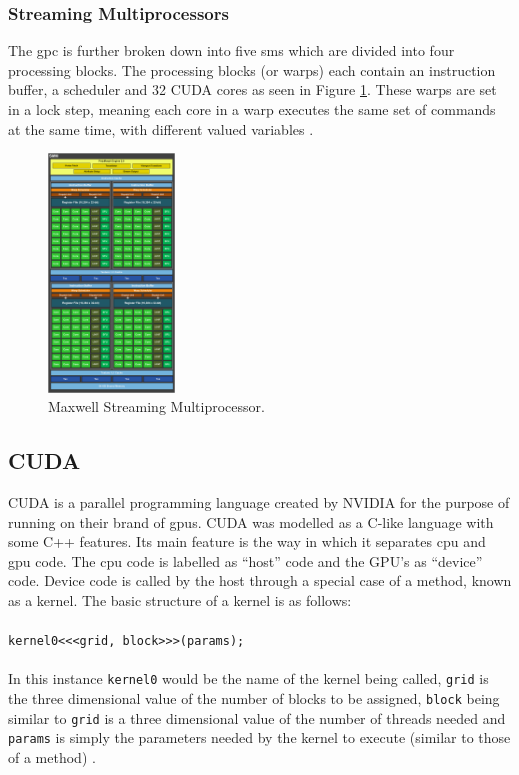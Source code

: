 \subsubsection{Streaming Multiprocessors}\label{gpu:ssec:smm}
The \gls{gpc} is further broken down into five \gls{sm}s which are divided into four processing blocks. The processing blocks (or warps) each contain an instruction buffer, a scheduler and 32 CUDA cores as seen in Figure \ref{gpu:img:smm}. These warps are set in a lock step, meaning each core in a warp executes the same set of commands at the same time, with different valued variables \citep{CUDA}.
%
\begin{figure}[H]
\centering
 \includegraphics[width=0.3\textwidth]{Images/GM107SMM.png}
 \caption[]{Maxwell Streaming Multiprocessor.\footnotemark}
 \label{gpu:img:smm}
\end{figure}
\subsection{CUDA}\label{gpu:sec:cuda}
CUDA is a parallel programming language created by NVIDIA for the purpose of running on their brand of \gls{gpu}s. CUDA was modelled as a C-like language with some C++ features. Its main feature is the way in which it separates \gls{cpu} and \gls{gpu} code. The \gls{cpu} code is labelled as ``host'' code and the GPU's as ``device'' code. Device code is called by the host through a special case of a method, known as a kernel. The basic structure of a kernel is as follows: 
\\
\\
\texttt{kernel0<<<grid, block>>>(params);}
\\
\\
In this instance \texttt{kernel0} would be the name of the kernel being called, \texttt{grid} is the three dimensional value of the number of blocks to be assigned, \texttt{block} being similar to \texttt{grid} is a three dimensional value of the number of threads needed and \texttt{params} is simply the parameters needed by the kernel to execute (similar to those of a method) \citep{CUDA}.
%
